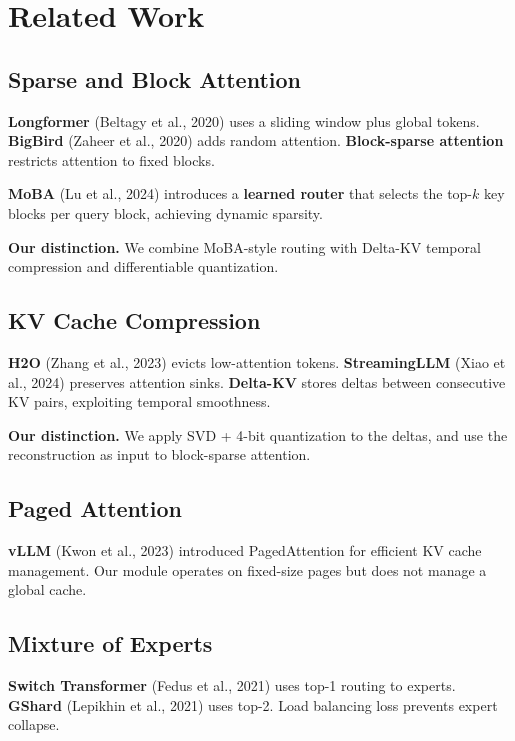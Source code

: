 \section{Related Work}

\subsection{Sparse and Block Attention}

\textbf{Longformer} (Beltagy et al., 2020) uses a sliding window plus global 
tokens. \textbf{BigBird} (Zaheer et al., 2020) adds random attention. 
\textbf{Block-sparse attention} restricts attention to fixed blocks.

\textbf{MoBA} (Lu et al., 2024) introduces a \textbf{learned router} that selects 
the top-$k$ key blocks per query block, achieving dynamic sparsity.

\textbf{Our distinction.} We combine MoBA-style routing with Delta-KV temporal 
compression and differentiable quantization.

\subsection{KV Cache Compression}

\textbf{H2O} (Zhang et al., 2023) evicts low-attention tokens. \textbf{StreamingLLM} 
(Xiao et al., 2024) preserves attention sinks. \textbf{Delta-KV} stores deltas 
between consecutive KV pairs, exploiting temporal smoothness.

\textbf{Our distinction.} We apply SVD + 4-bit quantization to the deltas, and 
use the reconstruction as input to block-sparse attention.

\subsection{Paged Attention}

\textbf{vLLM} (Kwon et al., 2023) introduced PagedAttention for efficient KV cache 
management. Our module operates on fixed-size pages but does not manage a 
global cache.

\subsection{Mixture of Experts}

\textbf{Switch Transformer} (Fedus et al., 2021) uses top-1 routing to experts. 
\textbf{GShard} (Lepikhin et al., 2021) uses top-2. Load balancing loss prevents 
expert collapse.

